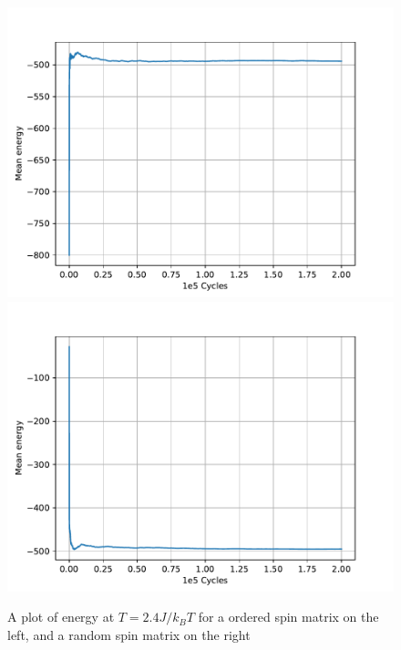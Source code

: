 \documentclass[a4paper]{article}
\begin{document}
\begin{figure}[!htb]
	\centering 
	\includegraphics[scale=0.56]{../opp_c_e_24K_200000_o.pdf}
	\includegraphics[scale=0.56]{../opp_c_e_24K_200000_r.pdf}
	\caption{A plot of energy at $T = 2.4 J/k_B T$ for a ordered spin matrix on the left, and a random spin matrix on the right}
	\label{c_e_2.4}
\end{figure}
\end{document}

